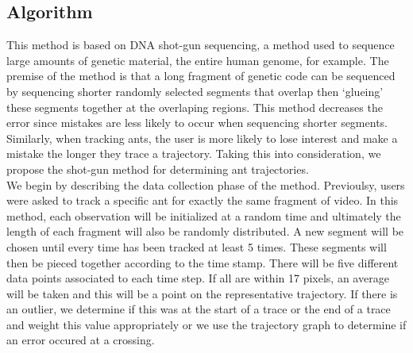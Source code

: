 \documentclass[12pt]{article}
\begin{document}
\subsection{Algorithm}
This method is based on DNA shot-gun sequencing, a method used to sequence large amounts of genetic material, the entire human genome, for example. The premise of the method is that a long fragment of genetic code can be sequenced by sequencing shorter randomly selected segments that overlap then `glueing' these segments together at the overlaping regions. This method decreases the error since mistakes are less likely to occur when sequencing shorter segments. Similarly, when tracking ants, the user is more likely to lose interest and make a mistake the longer they trace a trajectory. Taking this into consideration, we propose the shot-gun method for determining ant trajectories. \\
\indent We begin by describing the data collection phase of the method. Previoulsy, users were asked to track a specific ant for exactly the same fragment of video. In this method, each observation will be initialized at a random time and ultimately the length of each fragment will also be randomly distributed. A new segment will be chosen until every time has been tracked at least 5 times. These segments will then be pieced together according to the time stamp. There will be five different data points associated to each time step. If all are within 17 pixels, an average will be taken and this will be a point on the representative trajectory. If there is an outlier, we determine if this was at the start of a trace or the end of a trace and weight this value appropriately or we use the trajectory graph to determine if an error occured at a crossing. 
\end{document}
